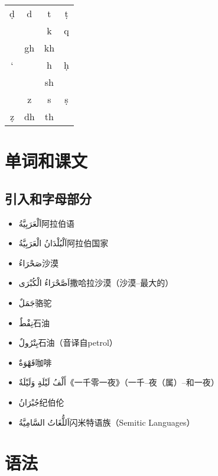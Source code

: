 \begin{note}
\begin{center}
\begin{multicols}{2}
    \begin{tabular}{cc||cc}
    
        \hline
        ḍ & d & t & ṭ \\
        && k & q \\
        & gh & kh \\
        ` && h & ḥ \\
        & \textipa{\textdyoghlig} & sh \\
        & z & s & ṣ \\
        ẓ & dh & th \\
        \hline

    \end{tabular}
    \end{multicols}
    \end{center}
\end{note}

\section{单词和课文}

\subsection{引入和字母部分}

\begin{itemize}
    \item \ac{اَلْعَرَبِيَّةُ}{阿拉伯语}
    \item \ac{اَلْبُلْدَانُ الْعَرَبِيَّةُ}{阿拉伯国家}
    \item \ac{صَحْرَاءُ}{沙漠}
    \item \ac{اَصَّحْرَاءُ الْكُبْرَى}{撒哈拉沙漠（沙漠--最大的）}
    \item \ac{جَمَلٌ}{骆驼}
    \item \ac{نِفْطٌ}{石油}
    \item \ac{بِتْرُولٌ}{石油（音译自petrol）}
    \item \ac{قَهْوَةٌ}{咖啡}
    \item \ac{أَلْفُ لَيْلَةِِ وَلَيْلَةٌ}{《一千零一夜》（一千--夜（属）--和一夜）}
    \item \ac{جُبْرَانُ}{纪伯伦}
    \item \ac{اَللُّغَاتُ السَّامِيَّةُ}{闪米特语族（Semitic Languages）}

\end{itemize}

\section{语法}


